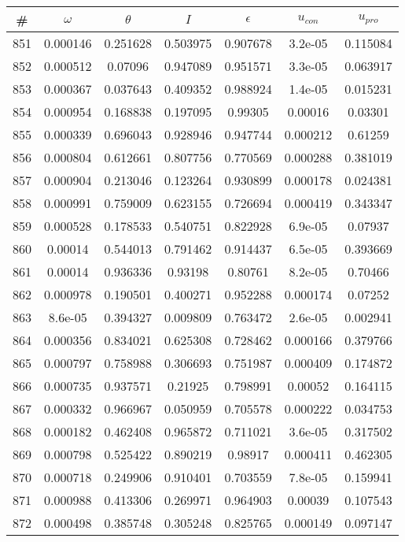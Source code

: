 \newpage
\begin{table}
\begin{tabular}{c|c|c|c|c|c|c}
\# & $\omega$ & $\theta$ & $I$ & $\epsilon$ & $u_{con}$ & $u_{pro}$\\
\hline
851 & 0.000146 & 0.251628 & 0.503975 & 0.907678 & 3.2e-05 & 0.115084\\
852 & 0.000512 & 0.07096 & 0.947089 & 0.951571 & 3.3e-05 & 0.063917\\
853 & 0.000367 & 0.037643 & 0.409352 & 0.988924 & 1.4e-05 & 0.015231\\
854 & 0.000954 & 0.168838 & 0.197095 & 0.99305 & 0.00016 & 0.03301\\
855 & 0.000339 & 0.696043 & 0.928946 & 0.947744 & 0.000212 & 0.61259\\
856 & 0.000804 & 0.612661 & 0.807756 & 0.770569 & 0.000288 & 0.381019\\
857 & 0.000904 & 0.213046 & 0.123264 & 0.930899 & 0.000178 & 0.024381\\
858 & 0.000991 & 0.759009 & 0.623155 & 0.726694 & 0.000419 & 0.343347\\
859 & 0.000528 & 0.178533 & 0.540751 & 0.822928 & 6.9e-05 & 0.07937\\
860 & 0.00014 & 0.544013 & 0.791462 & 0.914437 & 6.5e-05 & 0.393669\\
861 & 0.00014 & 0.936336 & 0.93198 & 0.80761 & 8.2e-05 & 0.70466\\
862 & 0.000978 & 0.190501 & 0.400271 & 0.952288 & 0.000174 & 0.07252\\
863 & 8.6e-05 & 0.394327 & 0.009809 & 0.763472 & 2.6e-05 & 0.002941\\
864 & 0.000356 & 0.834021 & 0.625308 & 0.728462 & 0.000166 & 0.379766\\
865 & 0.000797 & 0.758988 & 0.306693 & 0.751987 & 0.000409 & 0.174872\\
866 & 0.000735 & 0.937571 & 0.21925 & 0.798991 & 0.00052 & 0.164115\\
867 & 0.000332 & 0.966967 & 0.050959 & 0.705578 & 0.000222 & 0.034753\\
868 & 0.000182 & 0.462408 & 0.965872 & 0.711021 & 3.6e-05 & 0.317502\\
869 & 0.000798 & 0.525422 & 0.890219 & 0.98917 & 0.000411 & 0.462305\\
870 & 0.000718 & 0.249906 & 0.910401 & 0.703559 & 7.8e-05 & 0.159941\\
871 & 0.000988 & 0.413306 & 0.269971 & 0.964903 & 0.00039 & 0.107543\\
872 & 0.000498 & 0.385748 & 0.305248 & 0.825765 & 0.000149 & 0.097147\\

\end{tabular}
\end{table}
